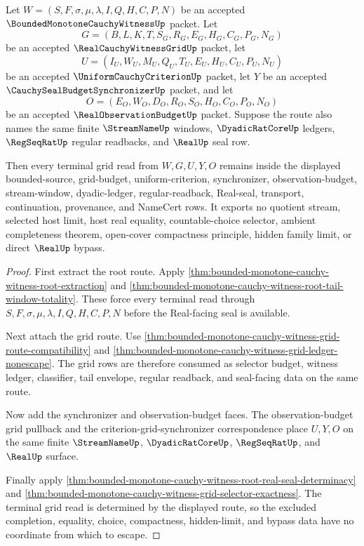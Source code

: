 \begin{theorem}
\label{thm:bounded-monotone-cauchy-witness-terminal-grid-nonescape}
Let $W=(S,F,\sigma,\mu,\lambda,I,Q,H,C,P,N)$ be an accepted $\BoundedMonotoneCauchyWitnessUp$ packet. Let
$$
G=(B,L,K,T,S_G,R_G,E_G,H_G,C_G,P_G,N_G)
$$
be an accepted $\RealCauchyWitnessGridUp$ packet, let
$$
U=(I_U,W_U,M_U,Q_U,T_U,E_U,H_U,C_U,P_U,N_U)
$$
be an accepted $\UniformCauchyCriterionUp$ packet, let $Y$ be an accepted $\CauchySealBudgetSynchronizerUp$ packet, and let
$$
O=(E_O,W_O,D_O,R_O,S_O,H_O,C_O,P_O,N_O)
$$
be an accepted $\RealObservationBudgetUp$ packet. Suppose the route also names the same finite $\StreamNameUp$ windows, $\DyadicRatCoreUp$ ledgers, $\RegSeqRatUp$ regular readbacks, and $\RealUp$ seal row.

Then every terminal grid read from $W,G,U,Y,O$ remains inside the displayed bounded-source, grid-budget, uniform-criterion, synchronizer, observation-budget, stream-window, dyadic-ledger, regular-readback, Real-seal, transport, continuation, provenance, and NameCert rows. It exports no quotient stream, selected host limit, host real equality, countable-choice selector, ambient completeness theorem, open-cover compactness principle, hidden family limit, or direct $\RealUp$ bypass.
\end{theorem}
\begin{proof}
First extract the root route. Apply \autoref{thm:bounded-monotone-cauchy-witness-root-extraction} and \autoref{thm:bounded-monotone-cauchy-witness-root-tail-window-totality}. These force every terminal read through $S,F,\sigma,\mu,\lambda,I,Q,H,C,P,N$ before the Real-facing seal is available.

Next attach the grid route. Use \autoref{thm:bounded-monotone-cauchy-witness-grid-route-compatibility} and \autoref{thm:bounded-monotone-cauchy-witness-grid-ledger-nonescape}. The grid rows are therefore consumed as selector budget, witness ledger, classifier, tail envelope, regular readback, and seal-facing data on the same route.

Now add the synchronizer and observation-budget faces. The observation-budget grid pullback and the criterion-grid-synchronizer correspondence place $U,Y,O$ on the same finite $\StreamNameUp$, $\DyadicRatCoreUp$, $\RegSeqRatUp$, and $\RealUp$ surface.

Finally apply \autoref{thm:bounded-monotone-cauchy-witness-root-real-seal-determinacy} and \autoref{thm:bounded-monotone-cauchy-witness-grid-selector-exactness}. The terminal grid read is determined by the displayed route, so the excluded completion, equality, choice, compactness, hidden-limit, and bypass data have no coordinate from which to escape.
\end{proof}

